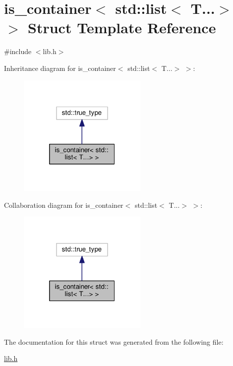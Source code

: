 \hypertarget{structis__container_3_01std_1_1list_3_01T_8_8_8_4_01_4}{\section{is\-\_\-container$<$ std\-:\-:list$<$ T...$>$ $>$ Struct Template Reference}
\label{structis__container_3_01std_1_1list_3_01T_8_8_8_4_01_4}
}


{\ttfamily \#include $<$lib.\-h$>$}



Inheritance diagram for is\-\_\-container$<$ std\-:\-:list$<$ T...$>$ $>$\-:
\nopagebreak
\begin{figure}[H]
\begin{center}
\leavevmode
\includegraphics[width=176pt]{structis__container_3_01std_1_1list_3_01T_8_8_8_4_01_4__inherit__graph}
\end{center}
\end{figure}


Collaboration diagram for is\-\_\-container$<$ std\-:\-:list$<$ T...$>$ $>$\-:
\nopagebreak
\begin{figure}[H]
\begin{center}
\leavevmode
\includegraphics[width=176pt]{structis__container_3_01std_1_1list_3_01T_8_8_8_4_01_4__coll__graph}
\end{center}
\end{figure}


The documentation for this struct was generated from the following file\-:\begin{DoxyCompactItemize}
\item 
\hyperlink{lib_8h}{lib.\-h}\end{DoxyCompactItemize}
